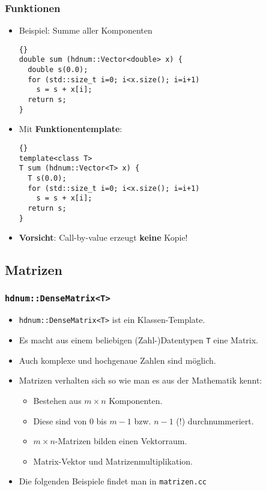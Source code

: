 \begin{frame}[fragile]
\frametitle{Funktionen}
\begin{itemize}
\item Beispiel: Summe aller Komponenten\\
{\footnotesize{\begin{lstlisting}{}
double sum (hdnum::Vector<double> x) {
  double s(0.0);
  for (std::size_t i=0; i<x.size(); i=i+1)
    s = s + x[i];
  return s;
}
\end{lstlisting}}}
\item Mit \textbf{Funktionentemplate}:\\
{\footnotesize{\begin{lstlisting}{}
template<class T>
T sum (hdnum::Vector<T> x) {
  T s(0.0);
  for (std::size_t i=0; i<x.size(); i=i+1)
    s = s + x[i];
  return s;
}
\end{lstlisting}}}
\item \textbf{Vorsicht}: Call-by-value erzeugt \textbf{keine} Kopie!
\end{itemize}
\end{frame}

\subsection{Matrizen}

\begin{frame}[fragile]
\frametitle{\lstinline{hdnum::DenseMatrix<T>}}
\begin{itemize}
\item \lstinline{hdnum::DenseMatrix<T>} ist ein Klassen-Template.
\item Es macht aus einem beliebigen (Zahl-)Datentypen \lstinline{T}
  eine Matrix.
\item Auch komplexe und hochgenaue Zahlen sind möglich.
\item Matrizen verhalten sich so wie man es aus der Mathematik kennt:
\begin{itemize}
\item Bestehen aus $m\times n$ Komponenten.
\item Diese sind von $0$ bis $m-1$ bzw. $n-1$ (!) durchnummeriert.
\item $m\times n$-Matrizen bilden einen Vektorraum.
\item Matrix-Vektor und Matrizenmultiplikation.
\end{itemize}
\item Die folgenden Beispiele findet man in \lstinline{matrizen.cc}
\end{itemize}
\end{frame}


